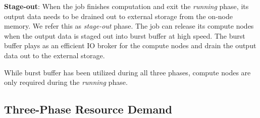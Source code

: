 \textbf{Stage-out}: When the job finishes computation and
         exit the \textit{running} phase, its output data needs to be drained out
         to external storage from the on-node memory. We refer this as \textit{stage-out} phase.
         The job can release its compute nodes when the output data is staged out
         into burst buffer at high speed. The burst buffer plays as an efficient
         IO broker for the compute nodes and drain the output data out to the external storage.

While burst buffer has been utilized during all three phases,
compute nodes are only required during the \textit{running} phase. 


\subsection{Three-Phase Resource Demand}

